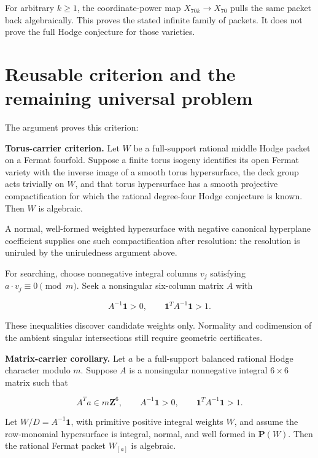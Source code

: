 For arbitrary \(k\ge1\), the coordinate-power map \(X_{70k}\to X_{70}\)
pulls the same packet back algebraically. This proves the stated
infinite family of packets. It does not prove the full Hodge conjecture
for those varieties.

\hypertarget{carrier70-reusable-criterion-and-the-remaining-universal-problem}{%
\section{Reusable criterion and the remaining universal
problem}\label{carrier70-reusable-criterion-and-the-remaining-universal-problem}}

The argument proves this criterion:

\textbf{Torus-carrier criterion.} Let \(W\) be a full-support rational
middle Hodge packet on a Fermat fourfold. Suppose a finite torus isogeny
identifies its open Fermat variety with the inverse image of a smooth
torus hypersurface, the deck group acts trivially on \(W\), and that
torus hypersurface has a smooth projective compactification for which
the rational degree-four Hodge conjecture is known. Then \(W\) is
algebraic.

A normal, well-formed weighted hypersurface with negative canonical
hyperplane coefficient supplies one such compactification after
resolution: the resolution is uniruled by the uniruledness argument
above.

For searching, choose nonnegative integral columns \(v_j\) satisfying
\(a\cdot v_j\equiv0\pmod m\). Seek a nonsingular six-column matrix \(A\)
with

\[
A^{-1}\mathbf1>0,\qquad \mathbf1^TA^{-1}\mathbf1>1.
\]

These inequalities discover candidate weights only. Normality and
codimension of the ambient singular intersections still require
geometric certificates.

\textbf{Matrix-carrier corollary.} Let \(a\) be a full-support balanced
rational Hodge character modulo \(m\). Suppose \(A\) is a nonsingular
nonnegative integral \(6\times6\) matrix such that

\[
A^Ta\in m\mathbf Z^6,\qquad A^{-1}\mathbf1>0,
\qquad\mathbf1^TA^{-1}\mathbf1>1.
\]

Let \(W/D=A^{-1}\mathbf1\), with primitive positive integral weights
\(W\), and assume the row-monomial hypersurface is integral, normal, and
well formed in \(\mathbf P(W)\). Then the rational Fermat packet
\(W_{[a]}\) is algebraic.


